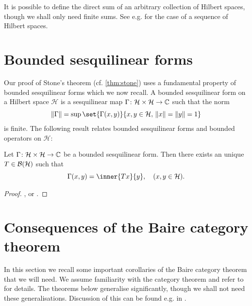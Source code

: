 \documentclass[article, a4paper, 11pt, oneside]{memoir}
\makeatletter
\numberwithin{equation}{chapter}
\newcommand{\calH}{\mathcal{H}}
\theoremstyle{myexample}
\theoremstyle{myexample}
\theoremstyle{myexamplebreak}
\theoremstyle{myexamplebreak}
\theoremstyle{nonumberplain}
\newtheorem{proof}{\protect\@proof}
\theoremstyle{MyNonumberplain}
\newcommand{\@proof}{}
\renewcommand{\@proof}{Proof}%
\renewcommand{\@proof}{Bevis}%
\makeatother
\begin{document}
It is possible to define the direct sum of an arbitrary collection of Hilbert spaces, though we shall only need finite sums. See e.g. \textcite[Section~I.6]{conway1990} for the case of a sequence of Hilbert spaces.

\section{Bounded sesquilinear forms}

Our proof of Stone's theorem (cf. \cref{thm:stone}) uses a fundamental property of bounded sesquilinear forms which we now recall. A bounded sesquilinear form on a Hilbert space $\calH$ is a sesquilinear map $\Gamma \colon \calH \times \calH \to \setC$ such that the norm
%
\begin{equation*}
    \norm{\Gamma}
        = \sup \set{\Gamma(x,y)}{x,y \in \calH,\, \norm{x} = \norm{y} = 1}
\end{equation*}
%
is finite. The following result relates bounded sesquilinear forms and bounded operators on $\calH$:

\begin{theorem}
    \label{thm:bounded_sesquilinear}
    Let $\Gamma \colon \calH \times \calH \to \setC$ be a bounded sesquilinear form. Then there exists an unique $T \in \boundedop(\calH)$ such that
    \begin{equation*}
        \Gamma(x,y)
            = \inner{Tx}{y},
            \quad (x,y \in \calH).
    \end{equation*}
\end{theorem}

\begin{proof}
    \textcite[Theorem~12.8]{rudinfunctional}, \textcite[Theorem~II.2.2]{conway1990} or \textcite[Theorem~3.20]{skibsted2019}.
\end{proof}


\section{Consequences of the Baire category theorem}

In this section we recall some important corollaries of the Baire category theorem that we will need. We assume familiarity with the category theorem and refer to \textcite[Section~5.3]{folland2007} for details. The theorems below generalise significantly, though we shall not need these generalisations. Discussion of this can be found e.g. in \textcite[Chapter~2]{rudinfunctional}.
\end{document}
